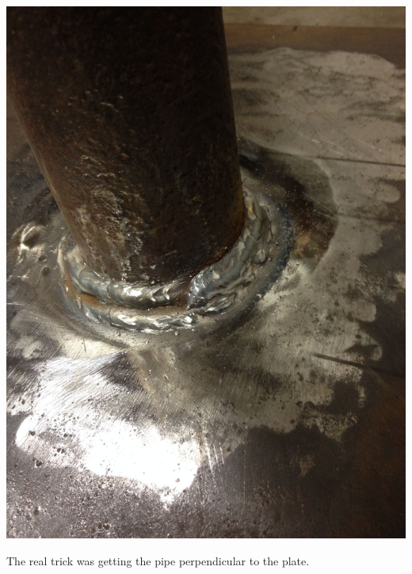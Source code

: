 \documentclass[11pt]{article} %
\begin{document}
\begin{center}
\includegraphics[scale=0.12]{roofmount/04.jpeg}
\end{center}


The real trick was getting the pipe perpendicular to the plate.
\end{document}
